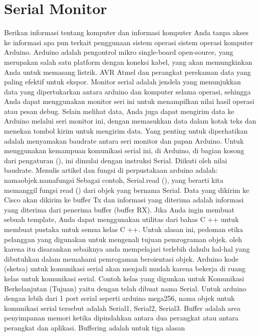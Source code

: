 \section{Serial Monitor}
Berikan informasi tentang komputer dan informasi komputer Anda tanpa akses ke informasi apa pun terkait penggunaan sistem operasi sistem operasi komputer Arduino. Arduino adalah pengontrol mikro single-board open-source, yang merupakan salah satu platform dengan koneksi kabel, yang akan memungkinkan Anda untuk memasang listrik. AVR Atmel dan perangkat perekaman data yang paling efektif untuk ekspor.
Monitor serial adalah jendela yang menunjukkan data yang dipertukarkan antara arduino dan komputer selama operasi, sehingga Anda dapat menggunakan monitor seri ini untuk menampilkan nilai hasil operasi atau pesan debug. Selain melihat data, Anda juga dapat mengirim data ke Arduino melalui seri monitor ini, dengan memasukkan data dalam kotak teks dan menekan tombol kirim untuk mengirim data. Yang penting untuk diperhatikan adalah menyamakan baudrate antara seri monitor dan papan Arduino. 
Untuk menggunakan kemampuan komunikasi serial ini, di Arduino, di bagian kosong dari pengaturan (), ini dimulai dengan instruksi Serial. Diikuti oleh nilai baudrate.
Menulis artikel dan fungsi di perpustakaan arduino adalah: namaobjek.namafungsi
Sebagai contoh, Serial.read (), yang berarti kita memanggil fungsi read () dari objek yang bernama Serial.
Data yang dikirim ke Cisco akan dikirim ke buffer Tx dan informasi yang diterima adalah informasi yang diterima dari penerima buffer (buffer RX).
Jika Anda ingin membuat sebuah template, Anda dapat menggunakan utilitas dari bahas C ++ untuk membuat pustaka untuk semua kelas C ++. Untuk alasan ini, pedoman etika pelanggan yang digunakan untuk mengenali tujuan pemrograman objek. oleh karena itu disarankan sebaiknya anda mempelajari terlebih dahulu hal-hal yang dibutuhkan dalam memahami pemrogaman beroientasi objek.
Arduino kode (sketsa) untuk komunikasi serial akan menjadi mudah karena bekerja di ruang kelas untuk komunikasi serial. Contoh kelas yang digunkan untuk Komunikasi Berkelanjutan (Tujuan) yaitu dengan telah dibuat nama Serial. Untuk arduino dengan lebih dari 1 port serial seperti arduino mega256, nama objek untuk komunikasi serial tersebut adalah Serial1, Serial2, Serial3.
Buffer adalah area penyimpanan memori ketika dipindahkan antara dua perangkat atau antara perangkat dan aplikasi. Buffering adalah untuk tiga alasan
